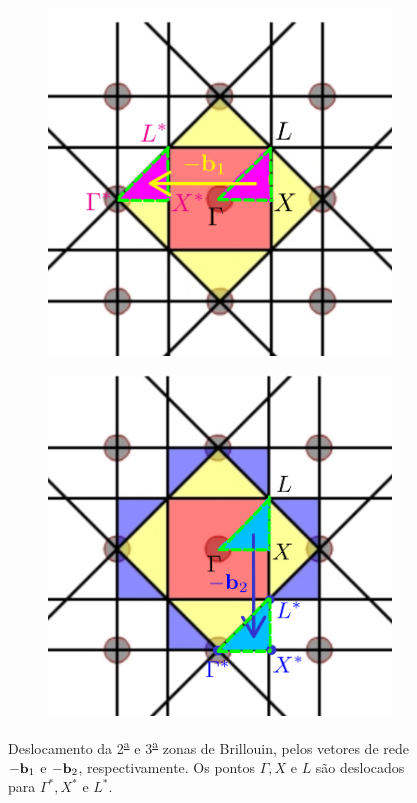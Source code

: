 \documentclass[a4paper,10pt]{article}
\begin{document}
\begin{figure}[H]
\centering
\begin{subfigure}{.4\textwidth}
  \centering
  \includegraphics[width=\linewidth]{fig/squarebz-2nd.png}
\end{subfigure}
\quad \quad
\begin{subfigure}{.4\textwidth}
  \centering
  \includegraphics[width=\linewidth]{fig/squarebz-3rd.png}
\end{subfigure}
\caption{Deslocamento da 2\textsuperscript{\underline{a}} e 3\textsuperscript{\underline{a}} zonas de Brillouin, pelos vetores de rede $-\vb{b}_1$ e $-\vb{b}_2$, respectivamente. Os pontos $\Gamma, X$ e $L$ são deslocados para $\Gamma^*, X^*$ e $L^*$.}
\label{fig:squarebz}
\end{figure}
\end{document}
